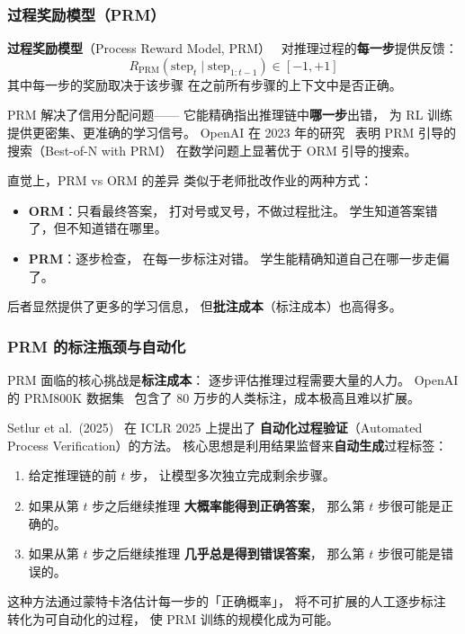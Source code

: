 \subsubsection{过程奖励模型（PRM）}

\textbf{过程奖励模型}（Process Reward Model, PRM）~\cite{lightman2024lets}
对推理过程的\textbf{每一步}提供反馈：
\begin{equation}
  R_{\text{PRM}}(\text{step}_t \mid \text{step}_{1:t-1}) \in [-1, +1]
  \label{eq:prm}
\end{equation}
其中每一步的奖励取决于该步骤
在之前所有步骤的上下文中是否正确。

PRM 解决了信用分配问题——
它能精确指出推理链中\textbf{哪一步}出错，
为 RL 训练提供更密集、更准确的学习信号。
OpenAI 在 2023 年的研究~\cite{lightman2024lets}
表明 PRM 引导的搜索（Best-of-N with PRM）
在数学问题上显著优于 ORM 引导的搜索。

\begin{whybox}
直觉上，PRM vs ORM 的差异
类似于老师批改作业的两种方式：
\begin{itemize}[noitemsep]
  \item \textbf{ORM}：只看最终答案，
        打对号或叉号，不做过程批注。
        学生知道答案错了，但不知道错在哪里。
  \item \textbf{PRM}：逐步检查，
        在每一步标注对错。
        学生能精确知道自己在哪一步走偏了。
\end{itemize}
后者显然提供了更多的学习信息，
但\textbf{批注成本}（标注成本）也高得多。
\end{whybox}

\subsubsection{PRM 的标注瓶颈与自动化}

PRM 面临的核心挑战是\textbf{标注成本}：
逐步评估推理过程需要大量的人力。
OpenAI 的 PRM800K 数据集~\cite{lightman2024lets}
包含了 80 万步的人类标注，成本极高且难以扩展。

Setlur et al.\ (2025)~\cite{setlur2025rewarding}
在 ICLR 2025 上提出了
\textbf{自动化过程验证}（Automated Process Verification）的方法。
核心思想是利用结果监督来\textbf{自动生成}过程标签：
\begin{enumerate}[noitemsep]
  \item 给定推理链的前 $t$ 步，
        让模型多次独立完成剩余步骤。
  \item 如果从第 $t$ 步之后继续推理
        \textbf{大概率能得到正确答案}，
        那么第 $t$ 步很可能是正确的。
  \item 如果从第 $t$ 步之后继续推理
        \textbf{几乎总是得到错误答案}，
        那么第 $t$ 步很可能是错误的。
\end{enumerate}
这种方法通过蒙特卡洛估计每一步的「正确概率」，
将不可扩展的人工逐步标注
转化为可自动化的过程，
使 PRM 训练的规模化成为可能。

